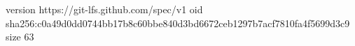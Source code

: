 version https://git-lfs.github.com/spec/v1
oid sha256:c0a49d0dd0744bb17b8c60bbe840d3bd6672ceb1297b7acf7810fa4f5699d3c9
size 63
